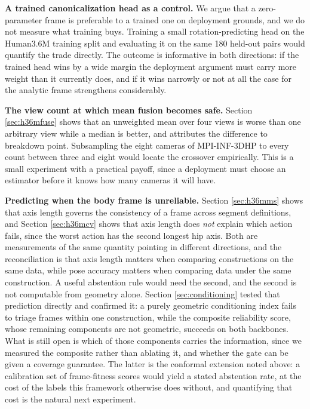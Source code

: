 \documentclass[12pt,a4paper]{report}
\begin{document}
\noindent \textbf{A trained canonicalization head as a control.} We argue that a zero-parameter frame is preferable to a trained one on deployment grounds, and we do not measure what training buys. Training a small rotation-predicting head on the Human3.6M training split and evaluating it on the same 180 held-out pairs would quantify the trade directly. The outcome is informative in both directions: if the trained head wins by a wide margin the deployment argument must carry more weight than it currently does, and if it wins narrowly or not at all the case for the analytic frame strengthens considerably.

\noindent \textbf{The view count at which mean fusion becomes safe.} Section \ref{sec:h36mfuse} shows that an unweighted mean over four views is worse than one arbitrary view while a median is better, and attributes the difference to breakdown point. Subsampling the eight cameras of MPI-INF-3DHP to every count between three and eight would locate the crossover empirically. This is a small experiment with a practical payoff, since a deployment must choose an estimator before it knows how many cameras it will have.

\noindent \textbf{Predicting when the body frame is unreliable.} Section \ref{sec:h36mms} shows that axis length governs the consistency of a frame across segment definitions, and Section \ref{sec:h36mcv} shows that axis length does \emph{not} explain which action fails, since the worst action has the second longest hip axis. Both are measurements of the same quantity pointing in different directions, and the reconciliation is that axis length matters when comparing constructions on the same data, while pose accuracy matters when comparing data under the same construction. A useful abstention rule would need the second, and the second is not computable from geometry alone. Section \ref{sec:conditioning} tested that prediction directly and confirmed it: a purely geometric conditioning index fails to triage frames within one construction, while the composite reliability score, whose remaining components are not geometric, succeeds on both backbones. What is still open is which of those components carries the information, since we measured the composite rather than ablating it, and whether the gate can be given a coverage guarantee. The latter is the conformal extension noted above: a calibration set of frame-fitness scores would yield a stated abstention rate, at the cost of the labels this framework otherwise does without, and quantifying that cost is the natural next experiment.
\end{document}
